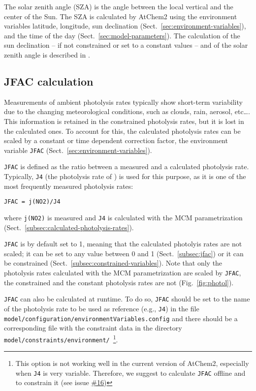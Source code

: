 The solar zenith angle (SZA) is the angle between the local vertical
and the center of the Sun. The SZA is calculated by AtChem2 using the
environment variables latitude, longitude, sun declination
(Sect.~\ref{sec:environment-variables}), and the time of the day
(Sect.~\ref{sec:model-parameters}). The calculation of the sun
declination -- if not constrained or set to a constant values -- and
of the solar zenith angle is described in \citet{madronich_1993}.

\subsection{JFAC calculation} \label{subsec:jfac-calculation}

Measurements of ambient photolysis rates typically show short-term
variability due to the changing meteorological conditions, such as
clouds, rain, aerosol, etc\ldots. This information is retained in the
constrained photolysis rates, but it is lost in the calculated
ones. To account for this, the calculated photolysis rates can be
scaled by a constant or time dependent correction factor, the
environment variable \texttt{JFAC} (Sect.~\ref{sec:environment-variables}).

\texttt{JFAC} is defined as the ratio between a measured and a
calculated photolysis rate. Typically, \texttt{J4} (the photolysis
rate of ) is used for this purpose, as it is one of the most
frequently measured photolysis rates:

\begin{verbatim}
JFAC = j(NO2)/J4
\end{verbatim}

where \texttt{j(NO2)} is measured and \texttt{J4} is calculated with
the MCM parametrization (Sect.~\ref{subsec:calculated-photolysis-rates}).

\texttt{JFAC} is by default set to 1, meaning that the calculated
photolyis rates are not scaled; it can be set to any value between 0
and 1 (Sect.~\ref{subsec:jfac}) or it can be constrained
(Sect.~\ref{subsec:constrained-variables}). Note that only the
photolysis rates calculated with the MCM parametrization are scaled by
\texttt{JFAC}, the constrained and the constant photolysis rates are
not (Fig.~\ref{fig:photol}).


\texttt{JFAC} can also be calculated at runtime. To do so,
\texttt{JFAC} should be set to the name of the photolysis rate to be
used as reference (e.g., \texttt{J4}) in the file
\texttt{model/configuration/environmentVariables.config} and there
should be a corresponding file with the constraint data in the
directory \texttt{model/constraints/environment/}~\footnote{This
  option is not working well in the current version of AtChem2,
  especially when \texttt{J4} is very variable. Therefore, we suggest
  to calculate \texttt{JFAC} offline and to constrain it (see issue
  \href{https://github.com/AtChem/AtChem2/issues/16}{\#16})}.

